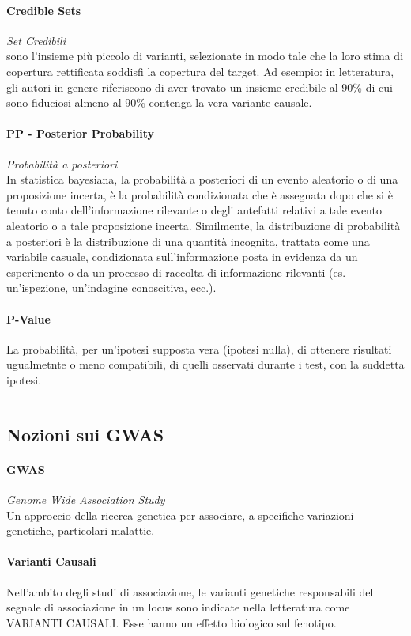 \documentclass{article}
\begin{document}
\paragraph{Credible Sets}\textit{Set Credibili}\\sono l'insieme più piccolo di varianti, selezionate in modo tale che la loro stima di copertura rettificata soddisfi la copertura del target. Ad esempio: in letteratura, gli autori in genere riferiscono di aver trovato un insieme credibile al 90\% di cui sono fiduciosi almeno al 90\% contenga la vera variante causale.
\paragraph{PP - Posterior Probability}\textit{Probabilità a posteriori}\\In statistica bayesiana, la probabilità a posteriori di un evento aleatorio o di una proposizione incerta, è la probabilità condizionata che è assegnata dopo che si è tenuto conto dell'informazione rilevante o degli antefatti relativi a tale evento aleatorio o a tale proposizione incerta. Similmente, la distribuzione di probabilità a posteriori è la distribuzione di una quantità incognita, trattata come una variabile casuale, condizionata sull'informazione posta in evidenza da un esperimento o da un processo di raccolta di informazione rilevanti (es. un'ispezione, un'indagine conoscitiva, ecc.).
\paragraph{P-Value}La probabilità, per un'ipotesi supposta vera (ipotesi nulla), di ottenere risultati ugualmetnte o meno compatibili, di quelli osservati durante i test, con la suddetta ipotesi.
\par\noindent\rule{\textwidth}{0.4pt}
\subsection*{Nozioni sui GWAS}
\paragraph{GWAS}\textit{Genome Wide Association Study}\\Un approccio della ricerca genetica per associare, a specifiche variazioni genetiche, particolari malattie.
\paragraph{Varianti Causali}Nell'ambito degli studi di associazione, le varianti genetiche responsabili del segnale di associazione in un locus sono indicate nella letteratura come VARIANTI CAUSALI. Esse hanno un effetto biologico sul fenotipo.
\end{document}
